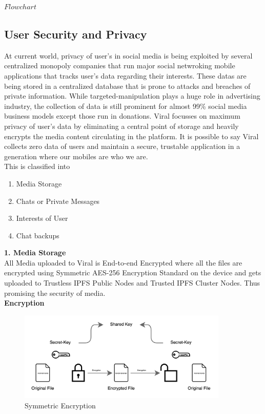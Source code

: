 \documentclass[10pt]{article}
\begin{document}
$Flow chart$

\subsection{User Security and Privacy}

At current world, privacy of user's in social media is being exploited by several centralized monopoly companies that run major social netwroking mobile applications that tracks user's data regarding their interests. These datas are being stored in a centralized database that is prone to attacks and breaches of private information. While targeted-manipulation plays a huge role in advertising industry, the collection of data is still prominent for almost 99\% social media business models except those run in donations. Viral focusses on maximum privacy of user's data by eliminating a central point of storage and heavily encrypts the media content circulating in the platform. It is possible to say Viral collects zero data of users and maintain a secure, trustable application in a generation where our mobiles are who we are.\\

This is classified into
\begin{enumerate}[leftmargin=+0.2in]
\item Media Storage
\item Chats or Private Messages
\item Interests of User
\item Chat backups
\end{enumerate}

\textbf{1. Media Storage}\\

All Media uploaded to Viral is End-to-end Encrypted where all the files are encrypted using Symmetric AES-256 Encryption Standard on the device and gets uploaded to Trustless IPFS Public Nodes and Trusted IPFS Cluster Nodes. Thus promising the security of media.\\

\textbf{Encryption}\\

\begin{figure}[H]
\begin{center}
\includegraphics[width=10cm]{aes}
\caption{Symmetric Encryption}
\end{center}
\end{figure}
\end{document}
